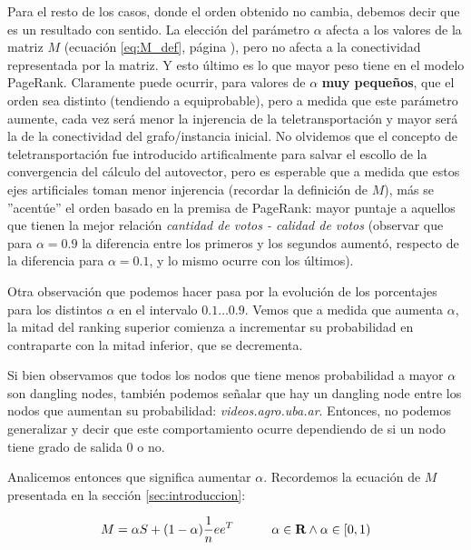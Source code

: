 \par Para el resto de los casos, donde el orden obtenido no cambia, debemos
decir que es un resultado con sentido. La elecci\'on del par\'ametro $\alpha$
afecta a los valores de la matriz $M$ (ecuaci\'on \ref{eq:M_def}, p\'agina
\pageref{eq:M_def}), pero no afecta a la conectividad representada por la
matriz. Y esto \'ultimo es lo que mayor peso tiene en el modelo PageRank.
Claramente puede ocurrir, para valores de $\alpha$ \textbf{muy peque\~nos}, que
el orden sea distinto (tendiendo a equiprobable), pero a medida que este
par\'ametro aumente, cada vez ser\'a menor la injerencia de la
teletransportaci\'on y mayor ser\'a la de la conectividad del grafo/instancia
inicial. No olvidemos que el concepto de teletransportaci\'on fue introducido
artificalmente para salvar el escollo de la convergencia del c\'alculo del
autovector, pero es esperable que a medida que estos ejes artificiales toman
menor injerencia (recordar la definici\'on de $M$), m\'as se ''acent\'ue'' el
orden basado en la premisa de PageRank: mayor puntaje a aquellos que tienen la
mejor relaci\'on \emph{cantidad de votos - calidad de votos} (observar que para
$\alpha=0.9$ la diferencia entre los primeros y los segundos aument\'o, respecto
de la diferencia para $\alpha=0.1$, y lo mismo ocurre con los \'ultimos).

\par Otra observaci\'on que podemos hacer pasa por la evoluci\'on de los
porcentajes para los distintos $\alpha$ en el intervalo $0.1\dots 0.9$.  Vemos
que a medida que aumenta $\alpha$, la mitad del ranking superior comienza
a incrementar su probabilidad en contraparte con la mitad inferior, que se
decrementa.

\par Si bien observamos que todos los nodos que tiene menos probabilidad a mayor
$\alpha$ son dangling nodes, tambi\'en podemos se\~nalar que hay un dangling
node entre los nodos que aumentan su probabilidad: \emph{videos.agro.uba.ar}.
Entonces, no podemos generalizar y decir que este comportamiento ocurre
dependiendo de si un nodo tiene grado de salida 0 o no.

\par Analicemos entonces que significa aumentar $\alpha$. Recordemos la
ecuaci\'on de $M$ presentada en la secci\'on \ref{sec:introduccion}:

\begin{equation*}
    M = \alpha S + (1-\alpha) \frac{1}{n}ee^T \quad\quad\quad \alpha\in\real
    \land \alpha\in\left[0,1\right) \label{eq:M_def}
\end{equation*}

